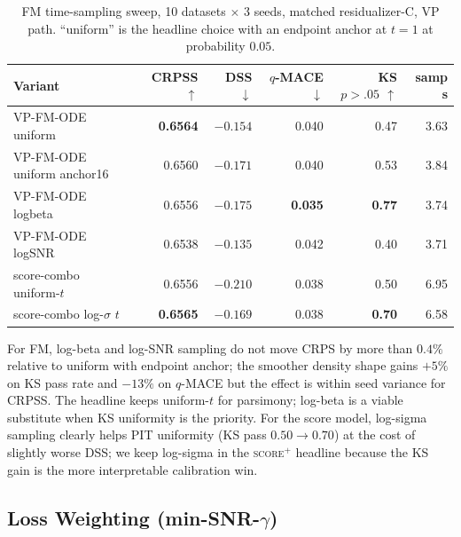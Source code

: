 \documentclass{uai2026}
\begin{document}
\begin{table}[!h]
  \centering
  \caption{FM time-sampling sweep, 10 datasets $\times$ 3 seeds, matched residualizer-C, VP path. ``uniform'' is the headline choice with an endpoint anchor at $t=1$ at probability $0.05$.}\label{tab:t-sampling}
  \footnotesize
  \begin{tabular}{lrrrrr}
    \toprule
    Variant & CRPSS $\uparrow$ & DSS $\downarrow$ & $q$-MACE $\downarrow$ & KS $p{>}.05$ $\uparrow$ & samp s \\
    \midrule
    VP-FM-ODE uniform           & \textbf{0.6564} & $-0.154$ & 0.040 & 0.47 & 3.63 \\
    VP-FM-ODE uniform anchor16  & 0.6560 & \textbf{$-0.171$} & 0.040 & 0.53 & 3.84 \\
    VP-FM-ODE logbeta           & 0.6556 & $-0.175$ & \textbf{0.035} & \textbf{0.77} & 3.74 \\
    VP-FM-ODE logSNR            & 0.6538 & $-0.135$ & 0.042 & 0.40 & 3.71 \\
    \midrule
    score-combo uniform-$t$     & 0.6556 & \textbf{$-0.210$} & 0.038 & 0.50 & 6.95 \\
    score-combo log-$\sigma$ $t$ & \textbf{0.6565} & $-0.169$ & 0.038 & \textbf{0.70} & 6.58 \\
    \bottomrule
  \end{tabular}
\end{table}

For FM, log-beta and log-SNR sampling do not move CRPS by more than $0.4\%$ relative to uniform with endpoint anchor; the smoother density shape gains $+5\%$ on KS pass rate and $-13\%$ on $q$-MACE but the effect is within seed variance for CRPSS. The headline keeps uniform-$t$ for parsimony; log-beta is a viable substitute when KS uniformity is the priority. For the score model, log-sigma sampling clearly helps PIT uniformity (KS pass $0.50 \to 0.70$) at the cost of slightly worse DSS; we keep log-sigma in the \textsc{score$^+$} headline because the KS gain is the more interpretable calibration win.

\subsection{Loss Weighting (min-SNR-$\gamma$)}\label{app:loss-weighting}
\end{document}
